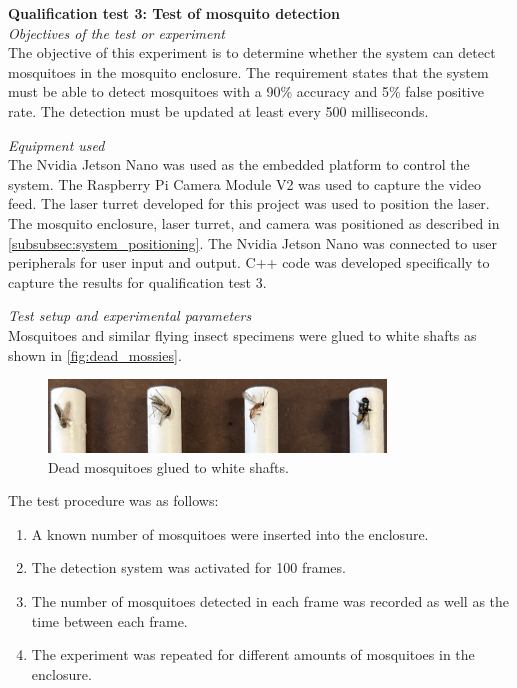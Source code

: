 \FloatBarrier
\textbf{Qualification test 3: Test of mosquito detection}\\

\textit{Objectives of the test or experiment}\\
The objective of this experiment is to determine whether the system can detect mosquitoes in the mosquito enclosure. The requirement states that the system must be able to detect mosquitoes with a 90\% accuracy and 5\% false positive rate. The detection must be updated at least every 500 milliseconds.

\textit{Equipment used}\\
The Nvidia Jetson Nano was used as the embedded platform to control the system. The Raspberry Pi Camera Module V2 was used to capture the video feed. The laser turret developed for this project was used to position the laser. The mosquito enclosure, laser turret, and camera was positioned as described in \autoref{subsubsec:system_positioning}. The Nvidia Jetson Nano was connected to user peripherals for user input and output. C++ code was developed specifically to capture the results for qualification test 3.

\textit{Test setup and experimental parameters}\\
Mosquitoes and similar flying insect specimens were glued to white shafts as shown in \autoref{fig:dead_mossies}.
\begin{figure}
  \centering
  \includegraphics[width=0.8\textwidth]{figures/results/dead_mossies.jpg}
  \caption{Dead mosquitoes glued to white shafts.}
  \label{fig:dead_mossies}
\end{figure}

The test procedure was as follows:
\begin{enumerate}
  \item A known number of mosquitoes were inserted into the enclosure.
  \item The detection system was activated for 100 frames.
  \item The number of mosquitoes detected in each frame was recorded as well as the time between each frame.
  \item The experiment was repeated for different amounts of mosquitoes in the enclosure.
\end{enumerate}

